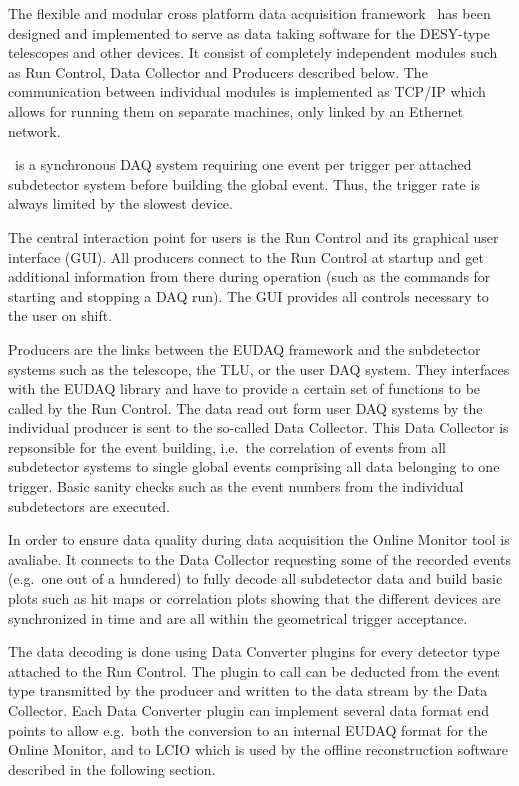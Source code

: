 
The flexible and modular cross platform data acquisition framework \eudaq\ has been designed and implemented to serve as data taking software for the DESY-type telescopes and other devices. It consist of completely independent modules such as Run Control, Data Collector and Producers described below. The communication between individual modules is implemented as TCP/IP which allows for running them on separate machines, only linked by an Ethernet network.

\eudaq\ is a synchronous DAQ system requiring one event per trigger per attached subdetector system before building the global event. Thus, the trigger rate is always limited by the slowest device.

The central interaction point for users is the Run Control and its graphical user interface (GUI). All producers connect to the Run Control at startup and get additional information from there during operation (such as the commands for starting and stopping a DAQ run). The GUI provides all controls necessary to the user on shift. 

Producers are the links between the EUDAQ framework and the subdetector systems such as the telescope, the TLU, or the user DAQ system. They interfaces with the EUDAQ library and have to provide a certain set of functions to be called by the Run Control. The data read out form user DAQ systems by the individual producer is sent to the so-called Data Collector. This Data Collector is repsonsible for the event building, i.e.\ the correlation of events from all subdetector systems to single global events comprising all data belonging to one trigger. Basic sanity checks such as the event numbers from the individual subdetectors are executed.

In order to ensure data quality during data acquisition the Online Monitor tool is avaliabe. It connects to the Data Collector requesting some of the recorded events (e.g.\ one out of a hundered) to fully decode all subdetector data and build basic plots such as hit maps or correlation plots showing that the different devices are synchronized in time and are all within the geometrical trigger acceptance.

The data decoding is done using Data Converter plugins for every detector type attached to the Run Control. The plugin to call can be deducted from the event type transmitted by the producer and written to the data stream by the Data Collector. Each Data Converter plugin can implement several data format end points to allow e.g.\ both the conversion to an internal EUDAQ format for the Online Monitor, and to LCIO which is used by the offline reconstruction software described in the following section.

